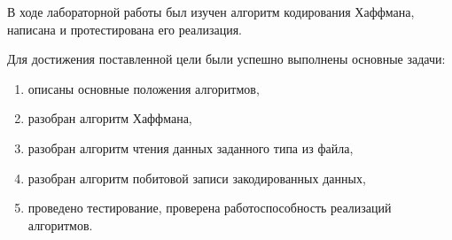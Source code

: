 
В ходе лабораторной работы был изучен алгоритм кодирования Хаффмана, написана и протестирована его реализация.

Для достижения поставленной цели были успешно выполнены основные задачи: 
\begin{enumerate}
	\item описаны основные положения алгоритмов,
	\item разобран алгоритм Хаффмана,
	\item разобран алгоритм чтения данных заданного типа из файла,
	\item разобран алгоритм побитовой записи закодированных данных,
	\item проведено тестирование, проверена работоспособность реализаций алгоритмов.
\end{enumerate}
